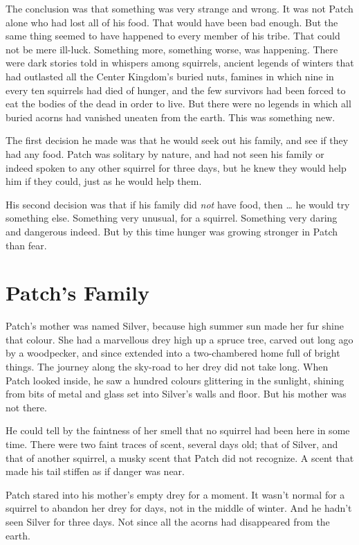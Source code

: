 \documentclass[ebook,oneside,openany,17pt]{memoir}
\newenvironment{tolerant}[1]{%
  \par\tolerance=#1\relax
}{%
  \par
}
\renewcommand{\thechapter}{\Roman{chapter}}
\newcounter{sections}
\newcommand{\sections}[1]{%
  \section*{#1}
  \addtocounter{sections}{1}%
  \pdfbookmark[1]{#1}{section.\thechapter.\thesections}}
\begin{document}
\begin{tolerant}{1500}
The conclusion was that something was very strange and wrong. It was
not Patch alone who had lost all of his food. That would have been bad
enough. But the same thing seemed to have happened to every member of
his tribe. That could not be mere ill-luck. Something more, something
worse, was happening. There were dark stories told in whispers among
squirrels, ancient legends of winters that had outlasted all the
Center Kingdom’s buried nuts, famines in which nine in every ten
squirrels had died of hunger, and the few survivors had been forced to
eat the bodies of the dead in order to live. But there were no legends
in which all buried acorns had vanished uneaten from the earth. This
was something new.
\end{tolerant}

The first decision he made was that he would seek out his family, and
see if they had any food. Patch was solitary by nature, and had not
seen his family or indeed spoken to any other squirrel for three days,
but he knew they would help him if they could, just as he would help
them.

His second decision was that if his family did \emph{not} have food,
then … he would try something else. Something very unusual, for a
squirrel. Something very daring and dangerous indeed. But by this time
hunger was growing stronger in Patch than fear.


\sections{Patch’s Family}

Patch’s mother was named Silver, because high summer sun made her fur
shine that colour. She had a marvellous drey high up a spruce tree,
carved out long ago by a woodpecker, and since extended into a
two-chambered home full of bright things. The journey along the
sky-road to her drey did not take long. When Patch looked inside, he
saw a hundred colours glittering in the sunlight, shining from bits of
metal and glass set into Silver’s walls and floor. But his mother was
not there.

He could tell by the faintness of her smell that no squirrel had been
here in some time. There were two faint traces of scent, several days
old; that of Silver, and that of another squirrel, a musky scent that
Patch did not recognize. A scent that made his tail stiffen as if
danger was near.

Patch stared into his mother’s empty drey for a moment. It wasn’t
normal for a squirrel to abandon her drey for days, not in the middle
of winter. And he hadn’t seen Silver for three days. Not since all the
acorns had disappeared from the earth.
\end{document}
